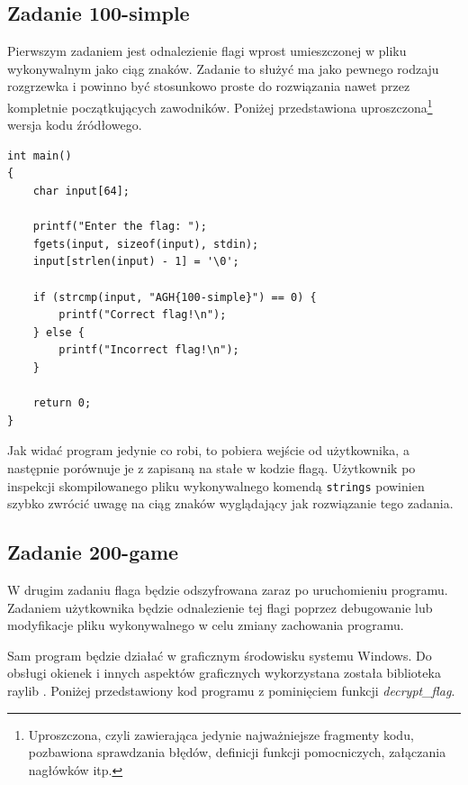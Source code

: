 \documentclass[polish,12pt]{aghthesis}
\begin{document}
\subsection{Zadanie 100-simple}

Pierwszym zadaniem jest odnalezienie flagi wprost umieszczonej
w pliku wykonywalnym jako ciąg znaków.
Zadanie to służyć ma jako pewnego rodzaju rozgrzewka i powinno być stosunkowo
proste do rozwiązania nawet przez kompletnie początkujących zawodników.
Poniżej przedstawiona uproszczona\footnote{Uproszczona, czyli zawierająca jedynie
najważniejsze fragmenty kodu, pozbawiona sprawdzania błędów, definicji funkcji
pomocniczych, załączania nagłówków itp.} wersja kodu źródłowego.

\begin{verbatim}
int main()
{
    char input[64];

    printf("Enter the flag: ");
    fgets(input, sizeof(input), stdin);
    input[strlen(input) - 1] = '\0';

    if (strcmp(input, "AGH{100-simple}") == 0) {
        printf("Correct flag!\n");
    } else {
        printf("Incorrect flag!\n");
    }

    return 0;
}
\end{verbatim}

Jak widać program jedynie co robi, to pobiera wejście od użytkownika, a następnie
porównuje je z zapisaną na stałe w kodzie flagą. Użytkownik po inspekcji skompilowanego
pliku wykonywalnego komendą \texttt{strings} powinien szybko zwrócić uwagę na
ciąg znaków wyglądający jak rozwiązanie tego zadania.
\clearpage

\subsection{Zadanie 200-game}

W drugim zadaniu flaga będzie odszyfrowana zaraz po uruchomieniu programu. Zadaniem
użytkownika będzie odnalezienie tej flagi poprzez debugowanie lub modyfikacje
pliku wykonywalnego w celu zmiany zachowania programu.

Sam program będzie działać w graficznym środowisku systemu Windows.
Do obsługi okienek i innych aspektów graficznych wykorzystana została
biblioteka raylib \cite{raylib}.
Poniżej przedstawiony kod programu z pominięciem funkcji \emph{decrypt\_flag}.
\end{document}
